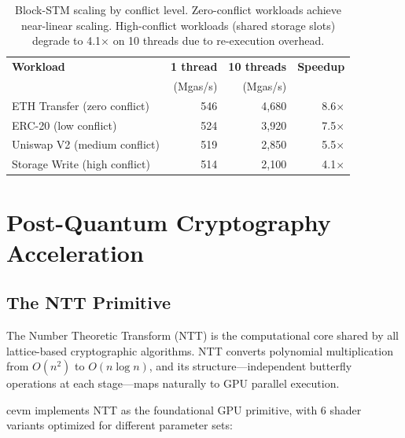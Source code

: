 \documentclass[11pt]{article}
\begin{document}
\begin{table}[h]
\centering
\small
\begin{tabular}{lrrr}
\toprule
\textbf{Workload} & \textbf{1 thread} & \textbf{10 threads} & \textbf{Speedup} \\
                   & (Mgas/s)          & (Mgas/s)            & \\
\midrule
ETH Transfer (zero conflict)  & 546  & 4{,}680 & 8.6$\times$ \\
ERC-20 (low conflict)         & 524  & 3{,}920 & 7.5$\times$ \\
Uniswap V2 (medium conflict)  & 519  & 2{,}850 & 5.5$\times$ \\
Storage Write (high conflict)  & 514  & 2{,}100 & 4.1$\times$ \\
\bottomrule
\end{tabular}
\caption{Block-STM scaling by conflict level. Zero-conflict workloads achieve
near-linear scaling. High-conflict workloads (shared storage slots) degrade
to 4.1$\times$ on 10 threads due to re-execution overhead.}
\label{tab:blockstm}
\end{table}

\section{Post-Quantum Cryptography Acceleration}
\label{sec:pq}

\subsection{The NTT Primitive}

The Number Theoretic Transform (NTT) is the computational core shared by all lattice-based
cryptographic algorithms. NTT converts polynomial multiplication from $O(n^2)$ to
$O(n \log n)$, and its structure---independent butterfly operations at each stage---maps
naturally to GPU parallel execution.

cevm implements NTT as the foundational GPU primitive, with 6 shader variants optimized
for different parameter sets:
\end{document}
